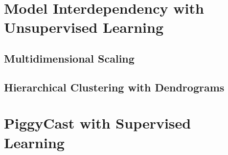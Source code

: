 \documentclass{article}
\begin{document}
\section{Model Interdependency with Unsupervised Learning}
\label{sec:headings}



\subsection{Multidimensional Scaling}









\subsection{Hierarchical Clustering with Dendrograms}

\section{PiggyCast with Supervised Learning}
\end{document}

